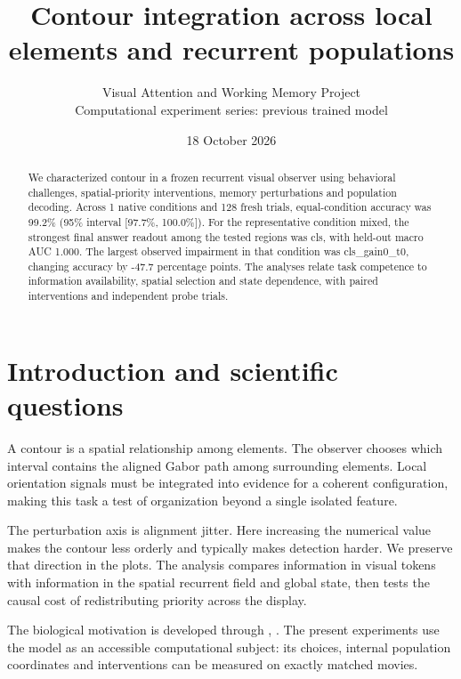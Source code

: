 \documentclass[11pt]{article}
\begin{document}
\title{\color{ink}Contour integration across local elements and recurrent populations}
\author{Visual Attention and Working Memory Project\\Computational experiment series: previous trained model}\date{18 October 2026}\maketitle
\begin{abstract}
We characterized contour in a frozen recurrent visual observer using behavioral challenges, spatial-priority interventions, memory perturbations and population decoding. Across 1 native conditions and 128 fresh trials, equal-condition accuracy was 99.2\% (95\% interval [97.7\%, 100.0\%]). For the representative condition mixed, the strongest final answer readout among the tested regions was cls, with held-out macro AUC 1.000. The largest observed impairment in that condition was cls\_\allowbreak{}gain0\_\allowbreak{}t0, changing accuracy by -47.7 percentage points. The analyses relate task competence to information availability, spatial selection and state dependence, with paired interventions and independent probe trials.
\end{abstract}
\section{Introduction and scientific questions}
A contour is a spatial relationship among elements. The observer chooses which interval contains the aligned Gabor path among surrounding elements. Local orientation signals must be integrated into evidence for a coherent configuration, making this task a test of organization beyond a single isolated feature.

The perturbation axis is alignment jitter. Here increasing the numerical value makes the contour less orderly and typically makes detection harder. We preserve that direction in the plots. The analysis compares information in visual tokens with information in the spatial recurrent field and global state, then tests the causal cost of redistributing priority across the display.

The biological motivation is developed through \cite{field}, \cite{treisman}. The present experiments use the model as an accessible computational subject: its choices, internal population coordinates and interventions can be measured on exactly matched movies.
\end{document}
